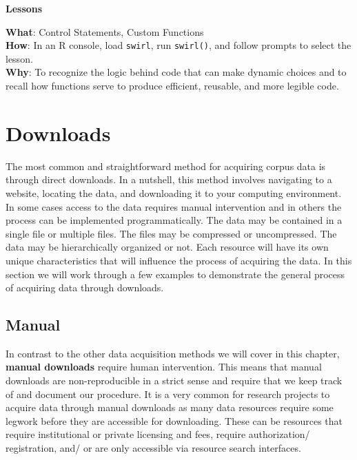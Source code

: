 \documentclass[
  letterpaper,
]{latex/krantz}
\theoremstyle{definition}
\theoremstyle{remark}
\begin{document}
\begin{tcolorbox}[enhanced jigsaw, colframe=quarto-callout-color-frame, breakable, bottomrule=.15mm, arc=.35mm, left=2mm, opacityback=0, rightrule=.15mm, colback=white, toprule=.15mm, leftrule=.75mm]

\textbf{ Lessons}

\textbf{What}: Control Statements, Custom Functions\\
\textbf{How}: In an R console, load \texttt{swirl}, run
\texttt{swirl()}, and follow prompts to select the lesson.\\
\textbf{Why}: To recognize the logic behind code that can make dynamic
choices and to recall how functions serve to produce efficient,
reusable, and more legible code.

\end{tcolorbox}

\section{Downloads}\label{downloads}

The most common and straightforward method for acquiring corpus data is
through direct downloads. In a nutshell, this method involves navigating
to a website, locating the data, and downloading it to your computing
environment. In some cases access to the data requires manual
intervention and in others the process can be implemented
programmatically. The data may be contained in a single file or multiple
files. The files may be compressed or uncompressed. The data may be
hierarchically organized or not. Each resource will have its own unique
characteristics that will influence the process of acquiring the data.
In this section we will work through a few examples to demonstrate the
general process of acquiring data through downloads.

\subsection{Manual}\label{manual}

In contrast to the other data acquisition methods we will cover in this
chapter, \textbf{manual downloads} require human intervention. This
means that manual downloads are non-reproducible in a strict sense and
require that we keep track of and document our procedure. It is a very
common for research projects to acquire data through manual downloads as
many data resources require some legwork before they are accessible for
downloading. These can be resources that require institutional or
private licensing and fees, require authorization/ registration, and/ or
are only accessible via resource search interfaces.
\end{document}
